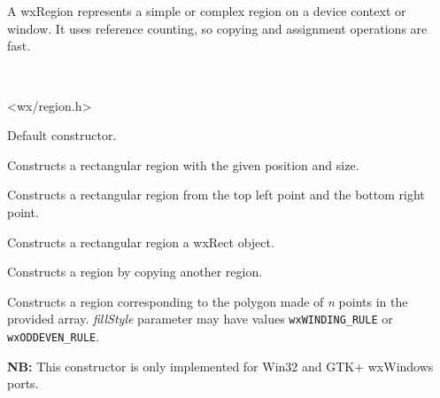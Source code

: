 \section{}\label{wxregion}

A wxRegion represents a simple or complex region on a device context or window. It uses
reference counting, so copying and assignment operations are fast.


\\


<wx/region.h>




\label{wxregionconstr}


Default constructor.


Constructs a rectangular region with the given position and size.


Constructs a rectangular region from the top left point and the bottom right point.


Constructs a rectangular region a wxRect object.


Constructs a region by copying another region.


Constructs a region corresponding to the polygon made of {\it n} points in the
provided array. {\it fillStyle} parameter may have values
{\tt wxWINDING\_RULE} or {\tt wxODDEVEN\_RULE}.

{\bf NB:} This constructor is only implemented for Win32 and GTK+ wxWindows ports.


